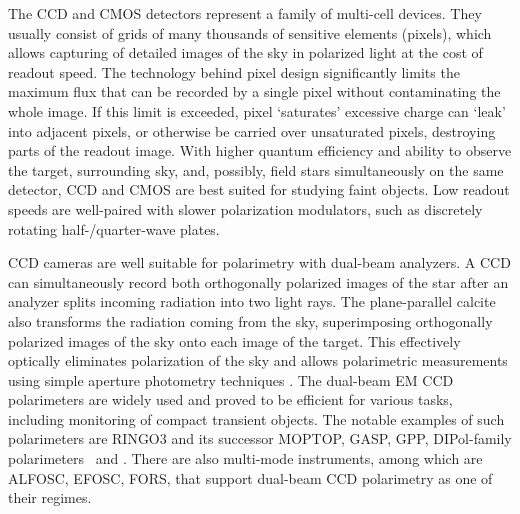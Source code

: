The \gls{CCD} and \gls{CMOS} detectors represent a family of multi-cell devices.
They usually consist of grids of many thousands of sensitive elements (pixels), which allows capturing of detailed images of the sky in polarized light at the cost of readout speed.
The technology behind pixel design significantly limits the maximum flux that can be recorded by a single pixel without contaminating the whole image. 
If this limit is exceeded, pixel `saturates' excessive charge can `leak' into adjacent pixels, or otherwise be carried over unsaturated pixels, destroying parts of the readout image.
With higher quantum efficiency and ability to observe the target, surrounding sky, and, possibly, field stars simultaneously on the same detector, \gls{CCD} and \gls{CMOS} are best suited for studying faint objects.
Low readout speeds are well-paired with slower polarization modulators, such as discretely rotating half-/quarter-wave plates.

\gls{CCD} cameras are well suitable for polarimetry with dual-beam analyzers.
A \gls{CCD} can simultaneously record both orthogonally polarized images of the star after an analyzer splits incoming radiation into two light rays.
The plane-parallel calcite also transforms the radiation coming from the sky, superimposing orthogonally polarized images of the sky onto each image of the target. 
This effectively optically eliminates polarization of the sky and allows polarimetric measurements using simple aperture photometry techniques \citep{Berdyugin2019}.
The dual-beam \gls{EM} \gls{CCD} polarimeters are widely used and proved to be efficient for various tasks, including monitoring of compact transient objects.
The notable examples of such polarimeters are RINGO3 \citep{Arnold2012} and its successor \gls{MOPTOP}, \gls{GASP}, \gls{GPP}, DIPol-family polarimeters \DP\ and \DUF.
There are also multi-mode instruments, among which are \gls{ALFOSC}, \gls{EFOSC}, \gls{FORS}, that support dual-beam \gls{CCD} polarimetry as one of their regimes.












